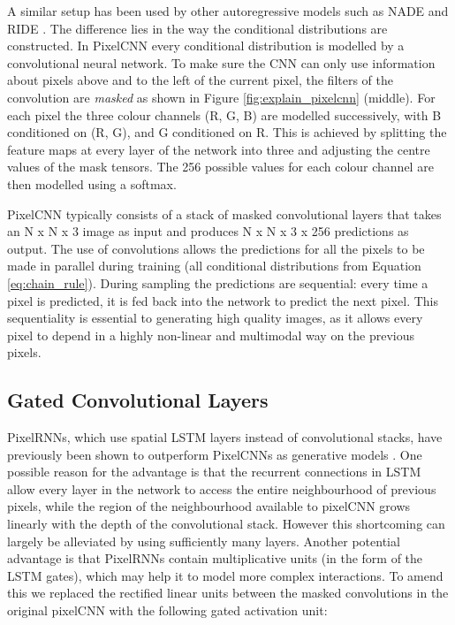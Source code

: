 \documentclass{article}
\begin{document}
A similar setup has been used by other autoregressive models such as NADE \cite{larochelle2011} and RIDE \cite{theis2015generative}. The difference lies in the way the conditional distributions  are constructed. In PixelCNN every conditional distribution is modelled by a convolutional neural network. To make sure the CNN can only use information about pixels above and to the left of the current pixel, the filters of the convolution are \emph{masked} as shown in Figure \ref{fig:explain_pixelcnn} (middle). For each pixel the three colour channels (R, G, B) are modelled successively, with B conditioned on (R, G), and G conditioned on R. This is achieved by splitting the feature maps at every layer of the network into three and adjusting the centre values of the mask tensors. The 256 possible values for each colour channel are then modelled using a softmax.

PixelCNN typically consists of a stack of masked convolutional layers that takes an N x N x 3 image as input and produces N x N x 3 x 256 predictions as output. The use of convolutions allows the predictions for all the pixels to be made in parallel during training (all conditional distributions from Equation \ref{eq:chain_rule}). During sampling the predictions are sequential: every time a pixel is predicted, it is fed back into the network to predict the next pixel. This sequentiality is essential to generating high quality images, as it allows every pixel to depend in a highly non-linear and multimodal way on the previous pixels.

\subsection{Gated Convolutional Layers}
 
PixelRNNs, which use spatial LSTM layers instead of convolutional stacks, have previously been shown to outperform PixelCNNs as generative models \cite{van2016pixel}. One possible reason for the advantage is that the recurrent connections in LSTM allow every layer in the network to access the entire neighbourhood of previous pixels, while the region of the neighbourhood available to pixelCNN grows linearly with the depth of the convolutional stack. However this shortcoming can largely be alleviated by using sufficiently many layers. Another potential advantage is that PixelRNNs contain multiplicative units (in the form of the LSTM gates), which may help it to model more complex interactions. To amend this we replaced the rectified linear units between the masked convolutions in the original pixelCNN with the following gated activation unit:
\end{document}
